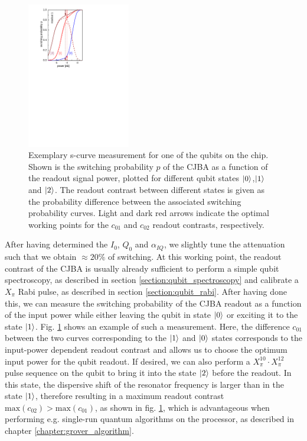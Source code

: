 \begin{figure}
\centering
\includegraphics[width=0.4\textwidth]{./material/papers/grover/figures/s_curves_example}
\caption{Exemplary s-curve measurement for one of the qubits on the chip. Shown is the switching probability $p$ of the CJBA as a function of the readout signal power, plotted for different qubit states $\left| 0 \right>$,$\left| 1 \right>$ and $\left| 2 \right>$. The readout contrast between different states is given as the probability difference between the associated switching probability curves. Light and dark red arrows indicate the optimal working points for the $c_{01}$ and $c_{02}$ readout contrasts, respectively.}
\label{fig:s_curves_example}
\end{figure}

\smallskip

After having determined the $I_0$, $Q_0$ and $\alpha_{IQ}$, we slightly tune the attenuation such that we obtain $\approx 20\%$  of switching. At this working point, the readout contrast of the CJBA is usually already sufficient to perform a simple qubit spectroscopy, as described in section \ref{section:qubit_spectroscopy} and calibrate a $X_\pi$ Rabi pulse, as described in section \ref{section:qubit_rabi}. After having done this, we can measure the switching probability of the CJBA readout as a function of the input power while either leaving the qubit in state $\left| 0 \right>$ or exciting it to the state $\left| 1 \right>$. Fig. \ref{fig:s_curves_example} shows an example of such a measurement. Here, the difference $c_{01}$ between the two curves corresponding to the $\left| 1 \right>$ and $\left| 0 \right>$ states corresponds to the input-power dependent readout contrast and allows us to choose the optimum input power for the qubit readout. If desired, we can also perform a $X_\pi^{10}\cdot X_\pi^{12}$ pulse sequence on the qubit to bring it into the state $\left| 2 \right>$ before the readout. In this state, the dispersive shift of the resonator frequency is larger than in the state $\left| 1 \right>$, therefore resulting in a maximum readout contrast $\mathrm{max}(c_{02})>\mathrm{max}(c_{01})$, as shown in fig. \ref{fig:s_curves_example}, which is advantageous when performing e.g. single-run quantum algorithms on the processor, as described in chapter \ref{chapter:grover_algorithm}.

